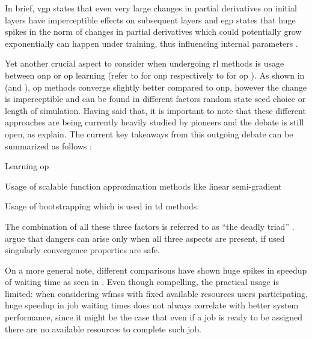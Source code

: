 In brief, \gls{vgp} states that even very large changes in partial derivatives on initial layers have imperceptible effects on subsequent layers \citep{Bengio1994} and \gls{egp} states that huge spikes in the norm of changes in partial derivatives which could potentially grow exponentially can happen under training, thus influencing internal parameters \citep{Bengio1994,Pascanu2012}.

Yet another crucial aspect to consider when undergoing \gls{rl} methods is usage between \gls{onp} or \gls{op} learning (refer to  for \gls{onp} respectively to  for \gls{op} ). As shown in  (and ), \gls{op} methods converge slightly better compared to \gls{onp}, however the change is imperceptible and can be found in different factors \eg random state seed choice or length of simulation. Having said that, it is important to note that these different approaches are being currently heavily studied by pioneers and the debate is still open, as \citet[pp. 245--249]{Sutton2017} explain. The current key takeaways from this outgoing debate can be summarized as follows \citep{Sutton2017}:
\begin{enumerate*}
	\item Learning \gls{op}
	\item Usage of scalable function approximation methods like linear semi-gradient 
	\item Usage of bootstrapping which is used in \gls{td} methods.
\end{enumerate*}

The combination of all these three factors is referred to as ``the deadly triad'' \citep[p. 249]{Sutton2017}. \citet[p. 249]{Sutton2017} argue that dangers can arise only when all three aspects are present, if used singularly convergence properties are safe.

On a more general note, different comparisons have shown huge spikes in speedup of waiting time \eg as seen in . Even though compelling, the practical usage is limited: when considering \glspl{wfms} with fixed available resources \ie users participating, huge speedup in job waiting times does not always correlate with better system performance, since it might be the case that even if a job is ready to be assigned there are no available resources to complete such job.



